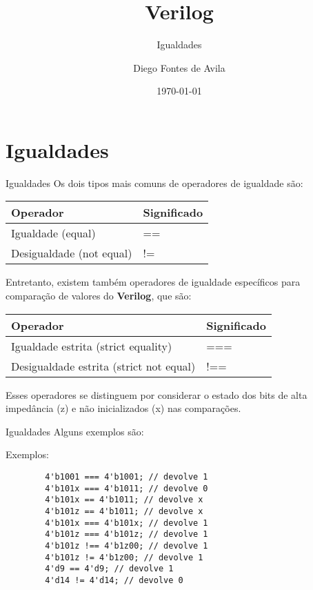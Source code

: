\documentclass[aspectratio=169,xcolor=dvipsnames]{beamer}
\title{Verilog}
\subtitle{Igualdades}
\author{Diego Fontes de Avila}
\institute
{
    Poliware \\
    Escola Politécnica da Universidade de São Paulo %
}
\date{\today} %
\begin{document}
\begin{frame}
    \titlepage
\end{frame}

\section{Igualdades}

\begin{frame}{Igualdades}
    Os dois tipos mais comuns de operadores de igualdade são:
    \begin{table}
        \begin{tabular}{l l}
            \toprule
            \textbf{Operador} & \textbf{Significado} \\
            \midrule
            Igualdade (equal)            & ==               \\
            Desigualdade (not equal)     & !=               \\
            \bottomrule
        \end{tabular}
    \end{table}
    Entretanto, existem também operadores de igualdade específicos para comparação de valores do \textbf{Verilog}, que são:
    \begin{table}
        \begin{tabular}{l l}
            \toprule
            \textbf{Operador} & \textbf{Significado} \\
            \midrule
            Igualdade estrita (strict equality)      & ===               \\
            Desigualdade estrita (strict not equal)  & !==               \\
            \bottomrule
        \end{tabular}
    \end{table}
    Esses operadores se distinguem por considerar o estado dos bits de alta impedância (z) e não inicializados (x) nas comparações.
\end{frame}
\begin{frame}[fragile]{Igualdades}
   Alguns exemplos são:
    \begin{block}{Exemplos:}
        \begin{verbatim}
        4'b1001 === 4'b1001; // devolve 1
        4'b101x === 4'b1011; // devolve 0
        4'b101x == 4'b1011; // devolve x
        4'b101z == 4'b1011; // devolve x
        4'b101x === 4'b101x; // devolve 1
        4'b101z === 4'b101z; // devolve 1
        4'b101z !== 4'b1z00; // devolve 1
        4'b101z != 4'b1z00; // devolve 1
        4'd9 == 4'd9; // devolve 1
        4'd14 != 4'd14; // devolve 0
        \end{verbatim}
    \end{block}
\end{frame}
\end{document}
